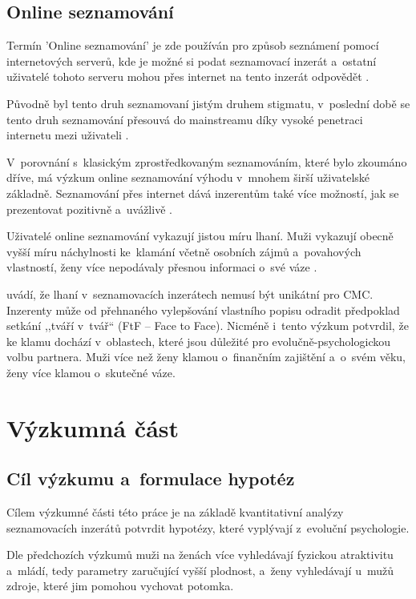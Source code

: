 \documentclass[a4paper, 12pt, notitlepage, oneside, numbers=noenddot]{report}
\begin{document}
\section{Online seznamování}

Termín 'Online seznamování' je zde používán pro způsob seznámení pomocí
internetových serverů, kde je možné si podat seznamovací inzerát
a~ostatní uživatelé tohoto serveru mohou přes internet na tento
inzerát odpovědět \citep{HallEtAl2010,EllisonEtAl2006}.

Původně byl tento druh seznamovaní jistým druhem stigmatu, v~poslední
době se tento druh seznamování přesouvá do mainstreamu díky vysoké
penetraci internetu mezi uživateli \citep{GibbsEtAl2006, HallEtAl2010,
  EllisonEtAl2006}.

V~porovnání s~klasickým zprostředkovaným seznamováním, které bylo
zkoumáno dříve, má výzkum online seznamování výhodu v~mnohem širší
uživatelské základně.  Seznamování přes internet dává inzerentům také
více možností, jak se prezentovat pozitivně a~uvážlivě
\citep{GibbsEtAl2006}.

Uživatelé online seznamování vykazují jistou míru lhaní.  Muži
vykazují obecně vyšší míru náchylnosti ke~klamání včetně osobních
zájmů a~povahových vlastností, ženy více nepodávaly přesnou informaci
o~své váze \citep{HallEtAl2010}.

\citet{HallEtAl2010} uvádí, že lhaní v~seznamovacích inzerátech nemusí
být unikátní pro CMC.  Inzerenty může od přehnaného vylepšování
vlastního popisu odradit předpoklad setkání ,,tváří v~tvář`` (FtF --
Face to Face).  Nicméně i~tento výzkum potvrdil, že ke klamu dochází
v~oblastech, které jsou důležité pro evolučně-psychologickou volbu
partnera.  Muži více než ženy klamou o~finančním zajištění a~o~svém
věku, ženy více klamou o~skutečné váze.

\chapter{Výzkumná část}
\section{Cíl výzkumu a~formulace hypotéz}
Cílem výzkumné části této práce je na základě kvantitativní analýzy
seznamovacích inzerátů potvrdit hypotézy, které vyplývají z~evoluční
psychologie.

Dle předchozích výzkumů \citep{BussEtAl1990,GreenlessMcGrew1994,%
  Gil-BurmanPelaezSanchez2002,WayfordDunbar1995,HarrisonSaeed1977}
muži na ženách více vyhledávají fyzickou atraktivitu a~mládí, tedy
parametry zaručující vyšší plodnost, a~ženy vyhledávají u~mužů zdroje,
které jim pomohou vychovat potomka.
\end{document}
